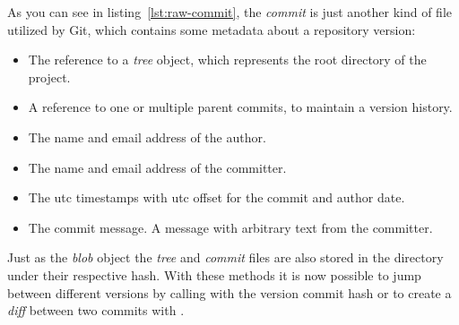 As you can see in listing~\ref{lst:raw-commit}, the \emph{commit} is just another kind of file utilized by Git, which contains some metadata about a repository version:

\begin{itemize}
    \item The reference to a \emph{tree} object, which represents the root directory of the project.
    \item A reference to one or multiple parent commits, to maintain a version history.
    \item The name and email address of the author.
    \item The name and email address of the committer.
    \item The \ac{utc} timestamps with \ac{utc} offset for the commit and author date.
    \item The commit message. A message with arbitrary text from the committer.
\end{itemize}

Just as the \emph{blob} object the \emph{tree} and \emph{commit} files are also stored in the  directory under their respective hash.
With these methods it is now possible to jump between different versions by calling  with the version commit hash or to create a \emph{diff} between two commits with .
